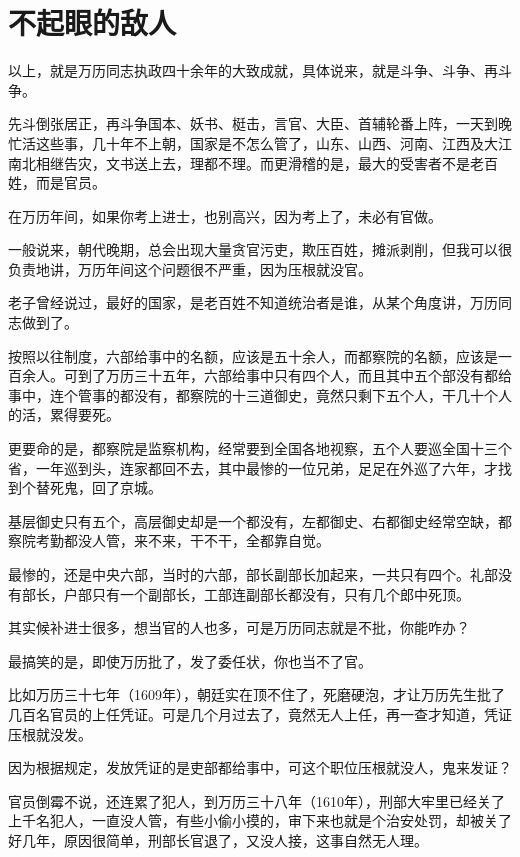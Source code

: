 \section{不起眼的敌人}
\ifnum{}
	\begin{multicols}{\theparacolNo}
\fi
以上，就是万历同志执政四十余年的大致成就，具体说来，就是斗争、斗争、再斗争。

先斗倒张居正，再斗争国本、妖书、梃击，言官、大臣、首辅轮番上阵，一天到晚忙活这些事，几十年不上朝，国家是不怎么管了，山东、山西、河南、江西及大江南北相继告灾，文书送上去，理都不理。而更滑稽的是，最大的受害者不是老百姓，而是官员。

在万历年间，如果你考上进士，也别高兴，因为考上了，未必有官做。

一般说来，朝代晚期，总会出现大量贪官污吏，欺压百姓，摊派剥削，但我可以很负责地讲，万历年间这个问题很不严重，因为压根就没官。

老子曾经说过，最好的国家，是老百姓不知道统治者是谁，从某个角度讲，万历同志做到了。

按照以往制度，六部给事中的名额，应该是五十余人，而都察院的名额，应该是一百余人。可到了万历三十五年，六部给事中只有四个人，而且其中五个部没有都给事中，连个管事的都没有，都察院的十三道御史，竟然只剩下五个人，干几十个人的活，累得要死。

更要命的是，都察院是监察机构，经常要到全国各地视察，五个人要巡全国十三个省，一年巡到头，连家都回不去，其中最惨的一位兄弟，足足在外巡了六年，才找到个替死鬼，回了京城。

基层御史只有五个，高层御史却是一个都没有，左都御史、右都御史经常空缺，都察院考勤都没人管，来不来，干不干，全都靠自觉。

最惨的，还是中央六部，当时的六部，部长副部长加起来，一共只有四个。礼部没有部长，户部只有一个副部长，工部连副部长都没有，只有几个郎中死顶。

其实候补进士很多，想当官的人也多，可是万历同志就是不批，你能咋办？

最搞笑的是，即使万历批了，发了委任状，你也当不了官。

比如万历三十七年（1609年），朝廷实在顶不住了，死磨硬泡，才让万历先生批了几百名官员的上任凭证。可是几个月过去了，竟然无人上任，再一查才知道，凭证压根就没发。

因为根据规定，发放凭证的是吏部都给事中，可这个职位压根就没人，鬼来发证？

官员倒霉不说，还连累了犯人，到万历三十八年（1610年），刑部大牢里已经关了上千名犯人，一直没人管，有些小偷小摸的，审下来也就是个治安处罚，却被关了好几年，原因很简单，刑部长官退了，又没人接，这事自然无人理。


\end{multicols}
